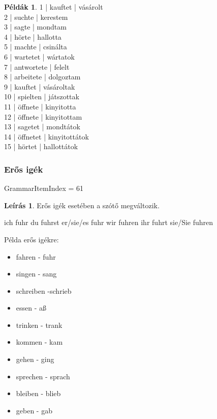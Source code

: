 \documentclass{article}
\theoremstyle{definition}
\newtheorem*{exmp}{Példák}
\newtheorem*{desc}{Leírás}
\begin{document}
\begin{exmp}
1 | kauftet | vásárolt\\
2 | suchte | kerestem\\
3 | sagte | mondtam\\
4 | hörte | hallotta\\
5 | machte | csinálta\\
6 | wartetet | wártatok\\
7 | antwortete | felelt\\
8 | arbeitete | dolgoztam\\
9 | kauftet | vásároltak\\
10 | spielten | játszottak\\
11 | öffnete | kinyitotta\\
12 | öffnete | kinyitottam\\
13 | sagetet | mondtátok\\
14 | öffnetet | kinyitottátok\\
15 | hörtet | hallottátok\\
\end{exmp}

\subsubsection{Erős igék}

GrammarItemIndex = 61

\begin{desc}
Erős igék esetében a szótő megváltozik.

ich fuhr
du fuhrst
er/sie/es fuhr
wir fuhren
ihr fuhrt
sie/Sie fuhren

Példa erős igékre:
\begin{itemize}
\item fahren - fuhr
\item singen - sang
\item schreiben -schrieb
\item essen - aß
\item trinken - trank
\item kommen - kam
\item gehen - ging
\item sprechen - sprach
\item bleiben - blieb
\item geben - gab
\end{itemize}
\end{desc}
\end{document}
